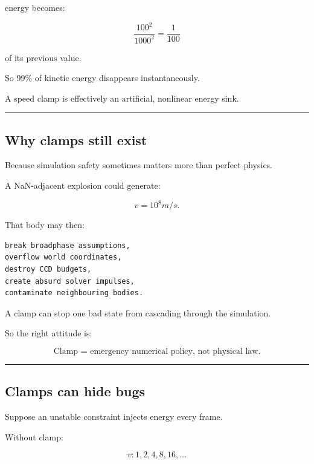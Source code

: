 energy becomes:

\[
\frac{100^2}{1000^2}
=
\frac1{100}
\]

of its previous value.

So 99\% of kinetic energy disappears instantaneously.

A speed clamp is effectively an artificial, nonlinear energy sink.

\begin{center}\rule{0.5\linewidth}{0.5pt}\end{center}

\subsection{Why clamps still exist}\label{06-engine-ii-ch038-why-clamps-still-exist}

\hypertarget{06-engine-ii-ch038-why-clamps-still-exist}{}

Because simulation safety sometimes matters more than perfect physics.

A NaN-adjacent explosion could generate:

\[
v=10^8m/s.
\]

That body may then:

\begin{verbatim}
break broadphase assumptions,
overflow world coordinates,
destroy CCD budgets,
create absurd solver impulses,
contaminate neighbouring bodies.
\end{verbatim}

A clamp can stop one bad state from cascading through the simulation.

So the right attitude is:

\[
\boxed{
\text{Clamp = emergency numerical policy, not physical law.}
}
\]

\begin{center}\rule{0.5\linewidth}{0.5pt}\end{center}

\subsection{Clamps can hide bugs}\label{06-engine-ii-ch038-clamps-can-hide-bugs}

\hypertarget{06-engine-ii-ch038-clamps-can-hide-bugs}{}

Suppose an unstable constraint injects energy every frame.

Without clamp:

\[
v:
1,2,4,8,16,\ldots
\]

